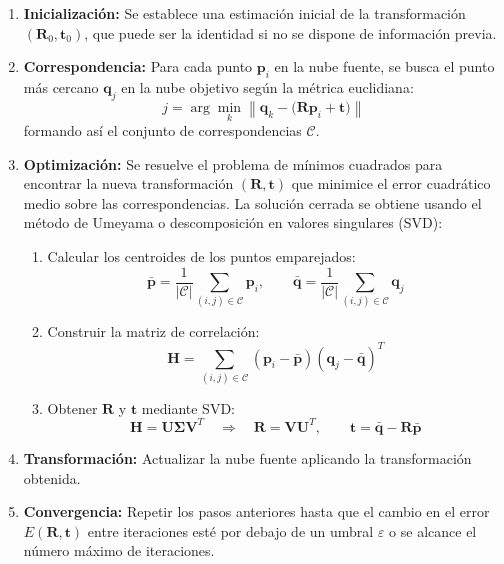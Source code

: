 \documentclass[12pt, a4paper, twoside]{article}
\begin{document}
\begin{itemize}
\begin{itemize}
    \begin{enumerate}
      \item \textbf{Inicialización:} Se establece una estimación inicial de la transformación $(\mathbf{R}_0, \mathbf{t}_0)$, que puede ser la identidad si no se dispone 
      de información previa.
      \item \textbf{Correspondencia:} Para cada punto $\mathbf{p}_i$ en la nube fuente, se busca el punto más cercano $\mathbf{q}_j$ en la nube objetivo según la métrica 
      euclidiana:
      \[
      j = \arg\min_{k} \left\| \mathbf{q}_k - \big(\mathbf{R}\mathbf{p}_i + \mathbf{t}\big) \right\|
      \]
      formando así el conjunto de correspondencias $\mathcal{C}$.
      \item \textbf{Optimización:} Se resuelve el problema de mínimos cuadrados para encontrar la nueva transformación $(\mathbf{R}, \mathbf{t})$ que minimice el error 
      cuadrático medio sobre las correspondencias. La solución cerrada se obtiene usando el método de Umeyama o descomposición en valores singulares (SVD):
      \begin{enumerate}
      \item Calcular los centroides de los puntos emparejados:
        \[
        \bar{\mathbf{p}} = \frac{1}{|\mathcal{C}|} \sum_{(i,j) \in \mathcal{C}} \mathbf{p}_i,
        \qquad
        \bar{\mathbf{q}} = \frac{1}{|\mathcal{C}|} \sum_{(i,j) \in \mathcal{C}} \mathbf{q}_j
        \]
        \item Construir la matriz de correlación:
        \[
        \mathbf{H} = \sum_{(i,j) \in \mathcal{C}}
        (\mathbf{p}_i - \bar{\mathbf{p}})
        (\mathbf{q}_j - \bar{\mathbf{q}})^{T}
        \]
        \item Obtener $\mathbf{R}$ y $\mathbf{t}$ mediante SVD:
        \[
        \mathbf{H} = \mathbf{U} \mathbf{\Sigma} \mathbf{V}^{T}
        \quad \Rightarrow \quad
        \mathbf{R} = \mathbf{V} \mathbf{U}^{T},
        \qquad
        \mathbf{t} = \bar{\mathbf{q}} - \mathbf{R}\bar{\mathbf{p}}
        \]
      \end{enumerate}
      \item \textbf{Transformación:} Actualizar la nube fuente aplicando la transformación obtenida.
      \item \textbf{Convergencia:} Repetir los pasos anteriores hasta que el cambio en el error $E(\mathbf{R}, \mathbf{t})$ entre iteraciones esté por debajo de un umbral 
      $\varepsilon$ o se alcance el número máximo de iteraciones.
        \end{enumerate}

\end{itemize}
\end{itemize}
\end{document}
